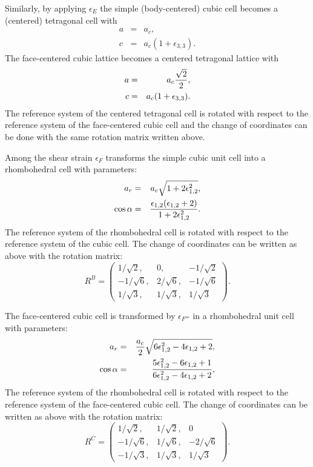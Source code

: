 \documentclass[12pt,a4paper]{article}
\begin{document}
Similarly, by applying $\epsilon_E$ the simple (body-centered) cubic
cell becomes a (centered) tetragonal cell with
\begin{eqnarray}
a&=&a_c,   \\
c&=&a_c (1+\epsilon_{3,3}).
\end{eqnarray}
The face-centered cubic lattice becomes a centered tetragonal lattice with
\begin{eqnarray}
a&=&a_c {\sqrt{2}\over 2},   \\
c&=&a_c (1+\epsilon_{3,3}).
\end{eqnarray}
The reference system of the centered tetragonal
cell is rotated with respect to the reference system of the face-centered
cubic cell and the change of coordinates can be done with the same rotation 
matrix written above.

Among the shear strain $\epsilon_F$
transforms the simple cubic unit cell into a rhombohedral cell with
parameters:
\begin{eqnarray}
a_r&=& a_c \sqrt{1+2\epsilon_{1,2}^2}, \\
\cos\alpha &=& {\epsilon_{1,2} (\epsilon_{1,2} + 2) \over 
1 + 2 \epsilon_{1,2}^2 }.
\end{eqnarray}
The reference system of the rhombohedral cell is rotated with respect to
the reference system of the cubic cell. The change of coordinates can
be written as above with the rotation matrix:
\begin{equation}
R^B=\left( \begin{array}{ccc}
1/\sqrt{2}, & 0, & -1/\sqrt{2}
\\
-1/\sqrt{6}, & 2/\sqrt{6}, & -1/\sqrt{6}
\\
1/\sqrt{3}, & 1/\sqrt{3}, & 1/\sqrt{3}
\end{array}
\right).
\end{equation}

The face-centered cubic cell is transformed by $\epsilon_{F'''}$
in a rhombohedral unit cell with parameters:
\begin{eqnarray}
a_r&=& {a_c \over 2} \sqrt{6 \epsilon_{1,2}^2-4 \epsilon_{1,2} +2}, \\
\cos\alpha &=& {5\epsilon_{1,2}^2- 6\epsilon_{1,2} + 1 \over 
6\epsilon_{1,2}^2 - 4\epsilon_{1,2}+2 },
\end{eqnarray}
The reference system of the rhombohedral cell is rotated with respect to
the reference system of the face-centered cubic cell. 
The change of coordinates can be written as above with the rotation matrix:
\begin{equation}
R^C=\left( \begin{array}{ccc}
1/\sqrt{2}, & 1/\sqrt{2}, & 0 \\
-1/\sqrt{6}, & 1/\sqrt{6}, & -2/\sqrt{6}
\\
-1/\sqrt{3}, & 1/\sqrt{3}, & 1/\sqrt{3}
\end{array}
\right).
\end{equation}
\end{document}
